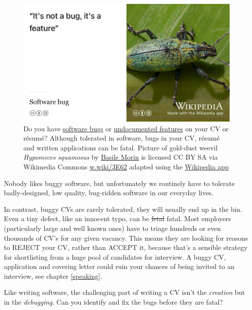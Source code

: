 \documentclass[
]{book}
\begin{document}
\begin{figure}

{\centering \includegraphics[width=0.99\linewidth]{images/notabug} 

}

\caption{Do you have \href{https://en.wikipedia.org/wiki/Software_bug}{software bugs} or \href{https://en.wikipedia.org/wiki/Undocumented_feature}{undocumented features} on your CV or résumé? Although tolerated in software, bugs in your CV, résumé and written applications can be fatal. Picture of gold-dust weevil \emph{Hypomeces squamosus} by \href{https://commons.wikimedia.org/wiki/User:Basile_Morin}{Basile Morin} is licensed CC BY SA via Wikimedia Commons \href{https://w.wiki/3E62}{w.wiki/3E62} adapted using the \href{https://apps.apple.com/us/app/wikipedia/id324715238}{Wikipedia app}}\label{fig:notabug-fig}
\end{figure}



Nobody likes buggy software, but unfortunately we routinely have to tolerate badly-designed, low quality, bug-ridden software in our everyday lives. \citep{badsoftware, failware}

In contrast, buggy CVs are rarely tolerated, they will usually end up in the bin. Even a tiny defect, like an innocent typo, can be \sout{fetal} fatal. Most employers (particularly large and well known ones) have to triage hundreds or even thousands of CV's for any given vacancy. This means they are looking for reasons to REJECT your CV, rather than ACCEPT it, because that's a sensible strategy for shortlisting from a huge pool of candidates for interview. A buggy CV, application and covering letter could ruin your chances of being invited to an interview, see chapter \ref{speaking}.

Like writing software, the challenging part of writing a CV isn't the \emph{creation} but in the \emph{debugging}. Can you identify and fix the bugs before they are fatal?
\end{document}
